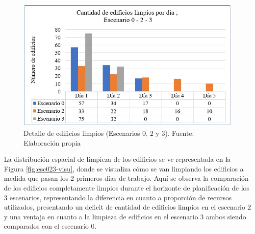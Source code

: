 \documentclass[12pt,a4paper]{article}
\begin{document}


\begin{figure}[h!]
\centering
\includegraphics[scale=0.8]{Figuras/INDIC3.jpg} 
\caption{Detalle de edificios limpios (Escenarios 0, 2 y 3), Fuente: Elaboración propia}
\label{fig:esc023graf}
\end{figure}



La distribución espacial de limpieza de los edificios se ve representada en la Figura \ref{fig:esc023-visu}, donde se visualiza cómo se van limpiando los edificios a medida que pasan los 2 primeros días de trabajo. Aquí se observa la comparación de los edificios completamente limpios durante el horizonte de planificación de los 3 escenarios, representando la diferencia en cuanto a proporción de recursos utilizados, presentando un deficit de cantidad de edificios limpios en el escenario 2 y una ventaja en cuanto a la limpieza de edificios en el escenario 3 ambos siendo comparados con el escenario 0.
\end{document}
